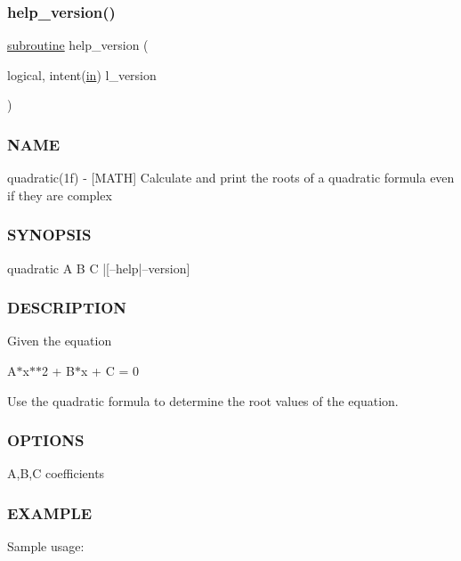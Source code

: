 \subsubsection{\texorpdfstring{help\+\_\+version()}{help\_version()}}
{\footnotesize\ttfamily \hyperlink{M__stopwatch_83_8txt_acfbcff50169d691ff02d4a123ed70482}{subroutine} help\+\_\+version (\begin{DoxyParamCaption}\item[{logical, intent(\hyperlink{M__journal_83_8txt_afce72651d1eed785a2132bee863b2f38}{in})}]{l\+\_\+version }\end{DoxyParamCaption})}



\subsubsection*{N\+A\+ME}

quadratic(1f) -\/ \mbox{[}M\+A\+TH\mbox{]} Calculate and print the roots of a quadratic formula even if they are complex 

\subsubsection*{S\+Y\+N\+O\+P\+S\+IS}

\begin{DoxyVerb}    quadratic A B C |[--help|--version]
\end{DoxyVerb}


\subsubsection*{D\+E\+S\+C\+R\+I\+P\+T\+I\+ON}

Given the equation

A$\ast$x$\ast$$\ast$2 + B$\ast$x + C = 0

Use the quadratic formula to determine the root values of the equation.

\subsubsection*{O\+P\+T\+I\+O\+NS}

A,B,C coefficients

\subsubsection*{E\+X\+A\+M\+P\+LE}

Sample usage\+:

